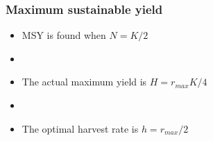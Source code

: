 \documentclass[color=usenames,dvipsnames,handout]{beamer}\usepackage[]{graphicx}\usepackage[]{color}
\begin{document}







\begin{frame}
  \frametitle{Maximum sustainable yield}
  \Large
  \begin{itemize}
    \item MSY is found when $N=K/2$
    \item[]
    \item The actual maximum yield is $H = r_{max}K/4$
    \item[]
    \item The optimal harvest rate is $h = r_{max}/2$
  \end{itemize}
\end{frame}
\end{document}
